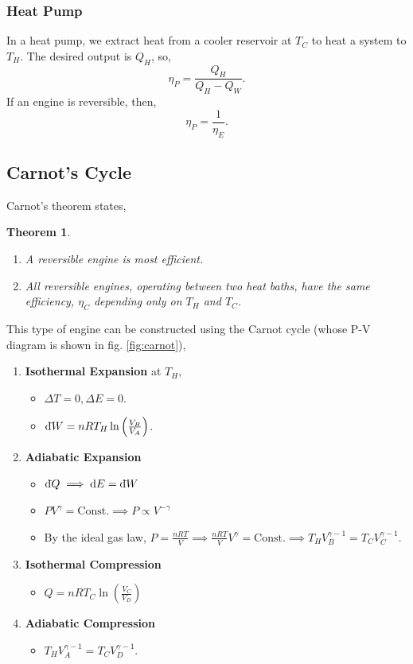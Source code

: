 \documentclass{book}
\newtheorem*{theorem}{Theorem}
\newcommand{\dbar}{\mathrm{d}\hspace*{-0.08em}\bar{}\hspace*{0.1em}}
\begin{document}
\subsubsection{Heat Pump}
In a heat pump, we extract heat from a cooler reservoir at $T_C$ to heat a system to $T_H$. The desired output is $Q_H$, so,
\begin{equation}
	\eta_P = \frac{Q_H}{Q_H - Q_W}.
\end{equation}
If an engine is reversible, then,
\begin{equation}
	\eta_P = \frac{1}{\eta_E}.
\end{equation}
\subsection{Carnot's Cycle}

Carnot's theorem states,
\begin{theorem}
	\hspace{5px}
	\begin{enumerate}
		\item A reversible engine is most efficient.
		\item All reversible engines, operating between two heat baths, have the same efficiency, $\eta_C$ depending only on $T_H$ and $T_C$.
	\end{enumerate}
\end{theorem}\noindent
This type of engine can be constructed using the Carnot cycle (whose P-V diagram is shown in fig. \ref{fig:carnot}),
\begin{enumerate}
	\item \textbf{Isothermal Expansion} at $T_H$,
	\begin{itemize}
		\item $\Delta T = 0, \Delta E = 0$.
		\item $\dbar W = nRT_H\ln\left(\frac{V_B}{V_A}\right)$.
	\end{itemize}
	\item \textbf{Adiabatic Expansion}
	\begin{itemize}
		\item $\dbar Q \implies \dd{E} = \dbar W$
		\item $PV^{\gamma} = \text{Const.} \implies P \propto V^{-\gamma}$
		\item By the ideal gas law, $P = \frac{nRT}{V} \implies \frac{nRT}{V}V^{\gamma} = \text{Const.} \implies T_H V_B^{\gamma - 1} = T_CV_C^{\gamma -1}$.
	\end{itemize}
	\item \textbf{Isothermal Compression}
	\begin{itemize}
		\item $Q = nRT_C\ln\left(\frac{V_C}{V_D}\right)$
	\end{itemize}
	\item \textbf{Adiabatic Compression}
	\begin{itemize}
		\item $T_H V_A^{\gamma -1} = T_CV_D^{\gamma -1}$.
	\end{itemize}
\end{enumerate}
\end{document}
